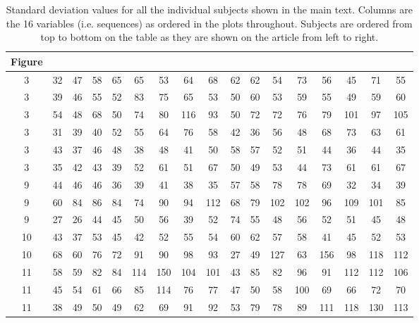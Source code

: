 \documentclass[12pt,letterpaper]{article}
\begin{document}
\clearpage

\begin{table}[t]
\centering
\begin{adjustbox}{width=1\textwidth}
\begin{tabular}{c|cccccccccccccccc}
Figure & \\
\hline
3 & 32 & 47 & 58 & 65 & 65 & 53 & 64 & 68 & 62 & 62 & 54 & 73 & 56 & 45 & 71 & 55 \\ 
3 & 39 & 46 & 55 & 52 & 83 & 75 & 65 & 53 & 50 & 60 & 53 & 59 & 55 & 49 & 59 & 60 \\ 
3 & 54 & 48 & 68 & 50 & 74 & 80 & 116 & 93 & 50 & 72 & 72 & 76 & 79 & 101 & 97 & 105 \\ 
3 & 31 & 39 & 40 & 52 & 55 & 64 & 76 & 58 & 42 & 36 & 56 & 48 & 68 & 73 & 63 & 61 \\ 
3 & 43 & 37 & 46 & 48 & 38 & 48 & 41 & 50 & 58 & 57 & 52 & 51 & 44 & 36 & 44 & 35 \\ 
3 & 35 & 42 & 43 & 39 & 52 & 61 & 51 & 67 & 50 & 49 & 53 & 44 & 73 & 61 & 61 & 67 \\ \hline
9 & 44 & 46 & 46 & 36 & 39 & 41 & 38 & 35 & 57 & 58 & 78 & 78 & 69 & 32 & 34 & 39 \\ 
9 & 60 & 84 & 86 & 84 & 74 & 90 & 94 & 112 & 68 & 79 & 102 & 102 & 96 & 109 & 101 & 85 \\ 
9 & 27 & 26 & 44 & 45 & 50 & 56 & 39 & 52 & 74 & 55 & 48 & 56 & 52 & 51 & 45 & 48 \\ \hline
10 & 43 & 37 & 53 & 45 & 42 & 52 & 55 & 54 & 60 & 62 & 57 & 58 & 41 & 45 & 52 & 53 \\ 
10 & 68 & 60 & 76 & 72 & 91 & 90 & 98 & 93 & 27 & 49 & 127 & 63 & 156 & 98 & 118 & 112 \\ \hline
11 & 58 & 59 & 82 & 84 & 114 & 150 & 104 & 101 & 43 & 85 & 82 & 96 & 91 & 112 & 112 & 106 \\ 
11 & 45 & 54 & 61 & 66 & 85 & 114 & 76 & 77 & 47 & 50 & 58 & 100 & 69 & 66 & 72 & 70 \\ 
11 & 38 & 49 & 50 & 49 & 62 & 69 & 91 & 92 & 53 & 79 & 78 & 89 & 111 & 118 & 130 & 113 \\ \hline
\end{tabular}
\end{adjustbox}
\caption[]{Standard deviation values for all the individual subjects shown in the main text. Columns are the 16 variables (i.e. sequences) as ordered in the plots throughout. Subjects are ordered from top to bottom on the table as they are shown on the article from left to right.}
\end{table}
\end{document}
